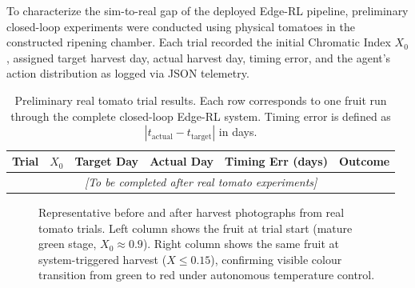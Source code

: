     To characterize the sim-to-real gap of the deployed Edge-RL pipeline, preliminary closed-loop experiments were conducted using physical tomatoes in the constructed ripening chamber. Each trial recorded the initial Chromatic Index $X_0$, assigned target harvest day, actual harvest day, timing error, and the agent's action distribution as logged via JSON telemetry.

    \begin{table}[ht]
        \caption{Preliminary real tomato trial results. Each row corresponds to one fruit run through the complete closed-loop Edge-RL system. Timing error is defined as $|t_{\text{actual}} - t_{\text{target}}|$ in days.}
        \label{tab:real_tomato_results}
        \centering
        \begin{tabular}{cccccc}
            \hline
            \textbf{Trial} & \textbf{$X_0$} & \textbf{Target Day} & \textbf{Actual Day} & \textbf{Timing Err (days)} & \textbf{Outcome} \\
            \hline
            \multicolumn{6}{c}{\itshape [To be completed after real tomato experiments]} \\
            \hline
        \end{tabular}
    \end{table}

    \begin{figure}[H]
        \centering
        \caption{Representative before and after harvest photographs from real tomato trials. Left column shows the fruit at trial start (mature green stage, $X_0 \approx 0.9$). Right column shows the same fruit at system-triggered harvest ($X \leq 0.15$), confirming visible colour transition from green to red under autonomous temperature control.}
        \label{fig:harvest_photos}
    \end{figure}

